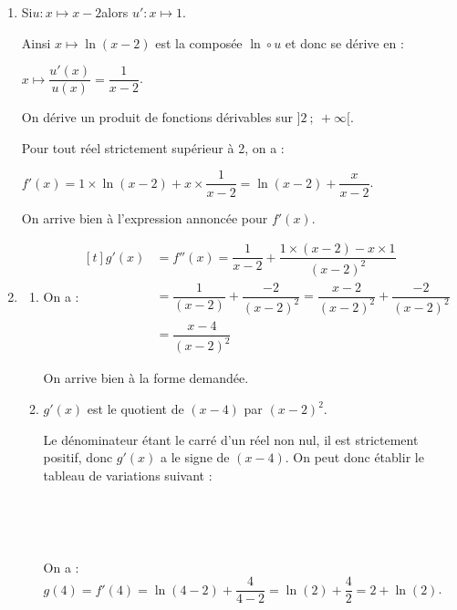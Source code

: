 \documentclass[10pt]{article}
\begin{document}
\begin{enumerate}
Cela confirme à la fois la conjecture sur la limite en 2 (en effet, comme $f$ n'est définie que sur $]2~;~+\infty]$, la limite en 2 est la limite à droite en 2), et cela confirme aussi la conjecture sur l'asymptote d'équation $x = 2$, qui est l'interprétation graphique de cette limite.

	\item Si\quad $u : x \longmapsto x - 2$\quad alors $u' : x \longmapsto 1$.

Ainsi \quad $x \longmapsto \ln(x-2)$ \quad est la composée $\ln \circ u$ et donc se dérive en :

$x \longmapsto \dfrac{u'(x)}{u(x)} = \dfrac{1}{x-2}$.

On dérive un produit de fonctions dérivables sur $]2~;~+\infty[$.

Pour tout réel strictement supérieur à 2, on a :

$f'(x) = 1 \times \ln(x - 2) + x \times \dfrac{1}{x - 2} = \ln(x-2) + \dfrac{x}{x - 2}$.

On arrive bien à l'expression annoncée pour $f'(x)$.

	\item \begin{enumerate}
		\item On a :\quad $\begin{aligned}[t]
			g'(x) &= f''(x) = \dfrac{1}{x - 2} + \dfrac{1 \times (x-2) - x \times 1}{(x-2)^2}\\
			&= \dfrac{1}{(x-2)} + \dfrac{-2}{(x-2)^2} = \dfrac{x-2}{(x-2)^2} + \dfrac{-2}{(x-2)^2}\\
			& = \dfrac{x - 4}{(x-2)^2}
		\end{aligned}$

On arrive bien à la forme demandée.

		\item $g'(x)$ est le quotient de $(x-4)$ par $(x-2)^2$.

Le dénominateur étant le carré d'un réel non nul, il est strictement positif, donc $g'(x)$ a le signe de $(x - 4)$. On peut donc établir le tableau de variations suivant :

\hfill~\hfill~

On a :\quad $g(4) = f'(4) = \ln(4 - 2) + \dfrac{4}{4 - 2} = \ln(2) + \dfrac{4}{2} = 2 + \ln (2)$.


\end{enumerate}
\end{enumerate}
\end{document}
